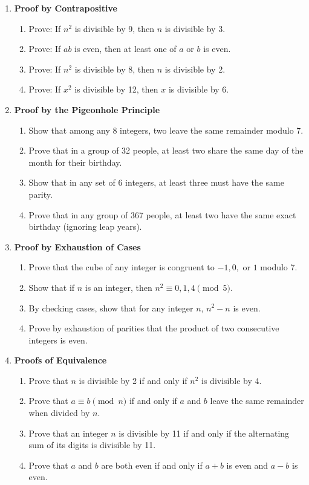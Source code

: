 \begin{enumerate}
\item \textbf{Proof by Contrapositive}
  \begin{enumerate}
    \item Prove: If $n^2$ is divisible by 9, then $n$ is divisible by 3.
    \item Prove: If $ab$ is even, then at least one of $a$ or $b$ is even.
    \item Prove: If $n^2$ is divisible by 8, then $n$ is divisible by 2.
    \item Prove: If $x^2$ is divisible by 12, then $x$ is divisible by 6.
  \end{enumerate}

\item \textbf{Proof by the Pigeonhole Principle}
  \begin{enumerate}
    \item Show that among any 8 integers, two leave the same remainder modulo 7.
    \item Prove that in a group of 32 people, at least two share the same day of the month for their birthday.
    \item Show that in any set of 6 integers, at least three must have the same parity.
    \item Prove that in any group of 367 people, at least two have the same exact birthday (ignoring leap years).
  \end{enumerate}

\item \textbf{Proof by Exhaustion of Cases}
  \begin{enumerate}
    \item Prove that the cube of any integer is congruent to $-1,0,$ or $1$ modulo 7.
    \item Show that if $n$ is an integer, then $n^2 \equiv 0,1,4 \pmod{5}$.
    \item By checking cases, show that for any integer $n$, $n^2-n$ is even.
    \item Prove by exhaustion of parities that the product of two consecutive integers is even.
  \end{enumerate}

\item \textbf{Proofs of Equivalence}
  \begin{enumerate}
    \item Prove that $n$ is divisible by 2 if and only if $n^2$ is divisible by 4.
    \item Prove that $a \equiv b \pmod{n}$ if and only if $a$ and $b$ leave the same remainder when divided by $n$.
    \item Prove that an integer $n$ is divisible by 11 if and only if the alternating sum of its digits is divisible by 11.
    \item Prove that $a$ and $b$ are both even if and only if $a+b$ is even and $a-b$ is even.
  \end{enumerate}
  

\end{enumerate}
